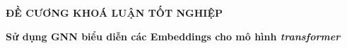 \documentclass{article}[14pt]
\begin{document}
    \begin{figure}[h]
        \begin{floatrow}
        {%
    
        }
        {%
    
        }
        \end{floatrow}
    \end{figure}
    
    \begin{center}
        
        \textbf{\Large ĐỀ CƯƠNG KHOÁ LUẬN TỐT NGHIỆP} \\ 
    \end{center}
    
    
    \begin{center}
        
        \textbf{\huge Sử dụng GNN biểu diễn các Embeddings cho mô hình  \textit{transformer} } 
        \\
        
    \end{center}
    
\end{document}
